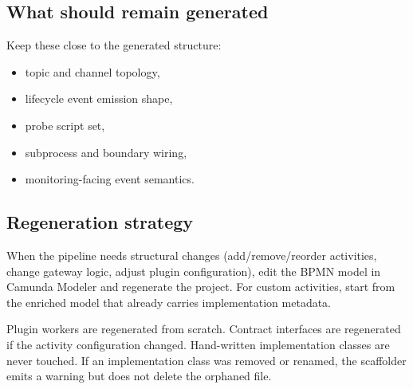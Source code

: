 \subsection{What should remain generated}

Keep these close to the generated structure:
\begin{itemize}
\item topic and channel topology,
\item lifecycle event emission shape,
\item probe script set,
\item subprocess and boundary wiring,
\item monitoring-facing event semantics.
\end{itemize}

\subsection{Regeneration strategy}

When the pipeline needs structural changes (add/remove/reorder activities, change
gateway logic, adjust plugin configuration), edit the BPMN model in Camunda Modeler
and regenerate the project. For custom activities, start from the enriched model
that already carries implementation metadata.

Plugin workers are regenerated from scratch. Contract interfaces are regenerated if
the activity configuration changed. Hand-written implementation classes are never
touched. If an implementation class was removed or renamed, the scaffolder emits a
warning but does not delete the orphaned file.
